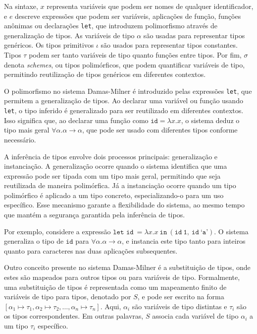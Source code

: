 Na sintaxe, $x$ representa variáveis que podem ser nomes de qualquer identificador, e $e$ descreve expressões que podem ser variáveis, aplicações de função, funções anônimas ou declarações \texttt{let}, que introduzem polimorfismo através de generalização de tipos.
As variáveis de tipo $\alpha$ são usadas para representar tipos genéricos.
Os tipos primitivos $\iota$ são usados para representar tipos constantes.
Tipos $\tau$ podem ser tanto variáveis de tipo quanto funções entre tipos.
Por fim, $\sigma$ denota \textit{schemes}, ou tipos polimórficos, que podem quantificar variáveis de tipo, permitindo reutilização de tipos genéricos em diferentes contextos.

O polimorfismo no sistema Damas-Milner é introduzido pelas expressões \texttt{let}, que permitem a generalização de tipos. Ao declarar uma variável ou função usando \texttt{let}, o tipo inferido é generalizado para ser reutilizado em diferentes contextos. Isso significa que, ao declarar uma função como $\texttt{id} = \lambda x.x$, o sistema deduz o tipo mais geral $\forall \alpha. \alpha \rightarrow \alpha$, que pode ser usado com diferentes tipos conforme necessário.

A inferência de tipos envolve dois processos principais: generalização e instanciação.
A generalização ocorre quando o sistema identifica que uma expressão pode ser tipada com um tipo mais geral, permitindo que seja reutilizada de maneira polimórfica.
Já a instanciação ocorre quando um tipo polimórfico é aplicado a um tipo concreto, especializando-o para um uso específico.
Esse mecanismo garante a flexibilidade do sistema, ao mesmo tempo que mantém a segurança garantida pela inferência de tipos.

Por exemplo, considere a expressão $\texttt{let id} \ = \lambda x.x \ \texttt{in} \ (\texttt{id} \ \texttt{1}, \ \texttt{id} \ \texttt{`a'})$.
O sistema generaliza o tipo de $\texttt{id}$ para $\forall \alpha. \alpha \rightarrow \alpha$, e instancia este tipo tanto para inteiros quanto para caracteres nas duas aplicações subsequentes.

Outro conceito presente no sistema Damas-Milner é a substituição de tipos, onde estes são mapeados para outros tipos ou para variáveis de tipo.
Formalmente, uma substituição de tipos é representada como um mapeamento finito de variáveis de tipo para tipos, denotado por $S$, e pode ser escrito na forma $[ \alpha_1 \mapsto \tau_1, \alpha_2 \mapsto \tau_2, \ldots, \alpha_n \mapsto \tau_n ]$.
Aqui, $\alpha_i$ são variáveis de tipo distintas e $\tau_i$ são os tipos correspondentes.
Em outras palavras, $S$ associa cada variável de tipo $\alpha_i$ a um tipo $\tau_i$ específico.

